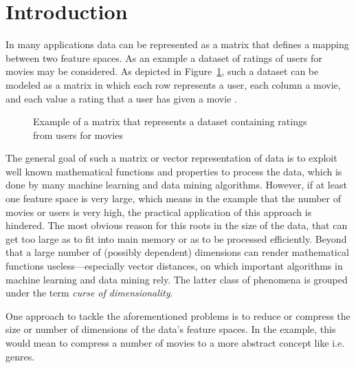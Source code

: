 \section{Introduction}

In many applications data can be represented as a matrix that defines a mapping between two feature spaces. As an example a dataset of ratings of users for movies may be considered. As depicted in Figure~\ref{fig:exmpl_matrix}, such a dataset can be modeled as a matrix in which each row represents a user, each column a movie, and each value a rating that a user has given a movie . 

\begin{figure}[h]
\centering
{}
\caption{Example of a matrix that represents a dataset containing ratings from users for movies}
\label{fig:exmpl_matrix}
\end{figure}

The general goal of such a matrix or vector representation of data is to exploit well known mathematical functions and properties to process the data, which is done by many machine learning and data mining algorithms. However, if at least one feature space is very large, which means in the example that the number of movies or users is very high, the practical application of this approach is hindered. The most obvious reason for this roots in the size of the data, that can get too large as to fit into main memory or as to be processed efficiently. Beyond that a large number of (possibly dependent) dimensions can render mathematical functions useless---especially vector distances, on which important algorithms in machine learning and data mining rely. The latter class of phenomena is grouped under the term \textsl{curse of dimensionality}.

One approach to tackle the aforementioned problems is to reduce or compress the size or number of dimensions of the data's feature spaces. In the example, this would mean to compress a number of movies to a more abstract concept like i.e. genres. 


